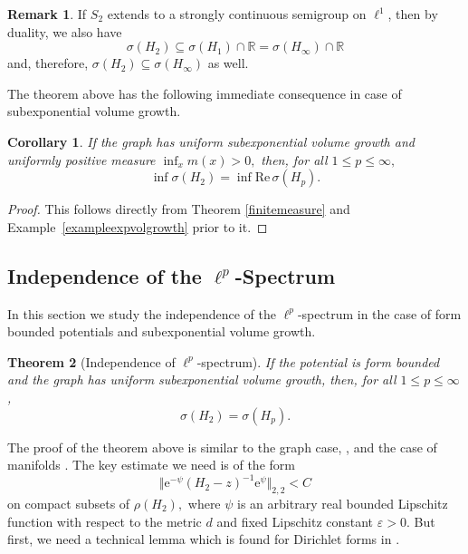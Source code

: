 \documentclass[10pt]{amsart}
\newtheorem{theorem}{Theorem}[section]
\newtheorem{corollary}[theorem]{Corollary}
\theoremstyle{definition}
\newtheorem*{remark}{Remark}
\begin{document}
\begin{remark}
    If $S_2$ extends to a strongly continuous semigroup on $\ell^1$, then by duality, we also have
    \[\sigma( H_2)\subseteq  \sigma( H_1)\cap\mathbb{R} = \sigma( H_\infty)\cap\mathbb{R} \]
    and, therefore, $\sigma( H_2)\subseteq\sigma( H_\infty)$ as well. 
\end{remark}

The theorem above has the following immediate consequence in case of  subexponential volume growth.

\begin{corollary}
    If the graph has uniform subexponential volume growth   and uniformly positive measure $\inf_xm(x)>0,$ then, for all $1\leq p\leq\infty,$
    \[\inf\sigma( H_2) = \inf\mathrm{Re}\,\sigma( H_p).\]
\end{corollary}
\begin{proof}
    This follows directly from Theorem \ref{finitemeasure} and Example~\ref{exampleexpvolgrowth} prior to it.
\end{proof}


\subsection{Independence of the $\ell^p$-Spectrum}

In this section we study  the independence of the $\ell^p$-spectrum in the case of form bounded potentials and  subexponential volume growth.



\begin{theorem}[Independence of $\ell^p$-spectrum]\label{lpIndependence}
   If the potential is form bounded  and the graph has uniform subexponential volume growth, then, for all $1\leq p\leq\infty$, \[\sigma( H_2) = \sigma( H_p).\] 
\end{theorem}

The proof of the theorem above is similar to the graph case, \cite{BauerHuaKeller}, and the case of manifolds \cite{Sturm}.
The key estimate we need is of the form 
\[\Vert\mathrm{e}^{-\psi}( H_2-z)^{-1}\mathrm{e}^\psi\Vert_{2,2}<C\] on compact subsets of $\rho( H_2),$ where $\psi$ is an arbitrary real bounded Lipschitz function with respect to the metric $d$ and fixed Lipschitz constant $\varepsilon>0.$ But first, we need a technical lemma which is found for Dirichlet forms in \cite[Lemma~3.5]{GHM}. 
\end{document}

